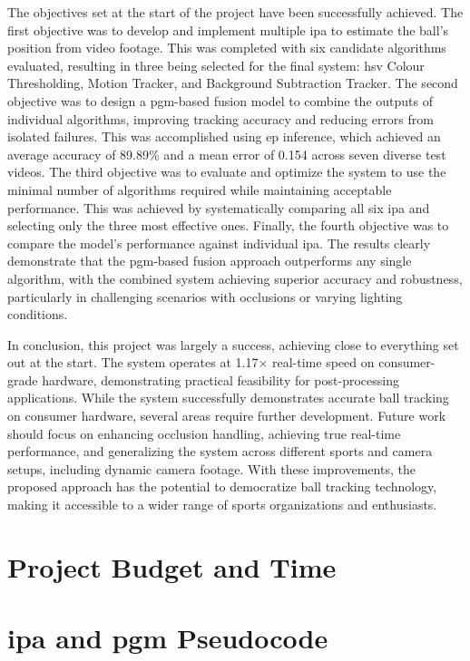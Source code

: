 \documentclass[12pt,a4paper]{article}
\begin{document}
The objectives set at the start of the project have been successfully achieved. The first objective was to develop and implement multiple \acs{ipa} to estimate the ball's position from video footage. This was completed with six candidate algorithms evaluated, resulting in three being selected for the final system: \acs{hsv} Colour Thresholding, Motion Tracker, and Background Subtraction Tracker. The second objective was to design a \acs{pgm}-based fusion model to combine the outputs of individual algorithms, improving tracking accuracy and reducing errors from isolated failures. This was accomplished using \acl{ep} inference, which achieved an average accuracy of 89.89\% and a mean error of 0.154 across seven diverse test videos. The third objective was to evaluate and optimize the system to use the minimal number of algorithms required while maintaining acceptable performance. This was achieved by systematically comparing all six \acs{ipa} and selecting only the three most effective ones. Finally, the fourth objective was to compare the model's performance against individual \acs{ipa}. The results clearly demonstrate that the \acs{pgm}-based fusion approach outperforms any single algorithm, with the combined system achieving superior accuracy and robustness, particularly in challenging scenarios with occlusions or varying lighting conditions.

In conclusion, this project was largely a success, achieving close to everything set out at the start. The system operates at 1.17× real-time speed on consumer-grade hardware, demonstrating practical feasibility for post-processing applications. While the system successfully demonstrates accurate ball tracking on consumer hardware, several areas require further development. Future work should focus on enhancing occlusion handling,	 achieving true real-time performance, and generalizing the system across different sports and camera setups, including dynamic camera footage. With these improvements, the proposed approach has the potential to democratize ball tracking technology, making it accessible to a wider range of sports organizations and enthusiasts.

\newpage
\printbibliography

\newpage
\appendix
\section{Project Budget and Time}

\newpage
\section{\acs{ipa} and \acs{pgm} Pseudocode}
\end{document}
